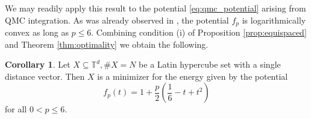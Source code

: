 \documentclass[a4paper,12pt]{article}
\numberwithin{equation}{section}
\theoremstyle{definition}
\newtheorem{rem}[thm]{Remark}
\newtheorem{cor}[thm]{Corollary}
\newcommand{\bbN}{\mathbb{N}}
\newcommand{\bbT}{\mathbb{T}}
\newcommand{\cS}{\mathcal{S}}
\newcommand{\sbse}{\subseteq}
\begin{document}
We may readily apply this result to the potential \eqref{eq:qmc_potential} arising from QMC integration. As was already observed in \cite{HO16}, the potential $f_p$ is logarithmically convex as long as $p \leq 6$. Combining condition (i) of  Proposition \ref{prop:equispaced}  and Theorem \ref{thm:optimality} we obtain the following.

\begin{cor} \label{cor:opt_qmc}
    Let $X \sbse \bbT^d, \#X = N$ be a Latin hypercube set with a single distance vector. Then $X$ is a minimizer for the energy given by the potential
    $$
    f_p(t) = 1 + \frac p2 \left(\frac16 - t + t^2\right)
    $$
    for all $0 < p \leq 6$.
\end{cor}

%
%    

\end{document}
